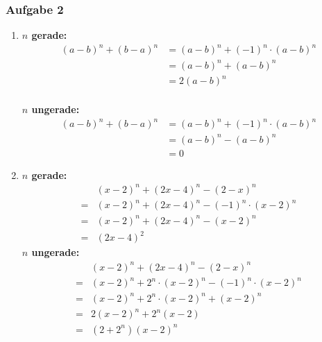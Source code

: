 \subsubsection{Aufgabe 2}
\begin{enumerate}
	\item \textbf{$ n $ gerade:} \begin{align*} (a-b)^n + (b-a)^n &= (a-b)^n + (-1)^n\cdot(a-b)^n \\
																																&= (a-b)^n + (a-b)^n \\
																																&= 2(a-b)^n \end{align*} \\
				\textbf{$ n $ ungerade:} \begin{align*}  (a-b)^n + (b-a)^n	&= (a-b)^n + (-1)^n\cdot(a-b)^n \\
																																		&= (a-b)^n -(a-b)^n \\
																																		&= 0 \end{align*}							%
	\item \textbf{$ n $ gerade:}\begin{align*}  &(x-2)^n + (2x-4)^n - (2-x)^n	\\
																						= &(x-2)^n + (2x-4)^n - (-1)^n\cdot(x-2)^n \\
																						= &(x-2)^n + (2x-4)^n - (x-2)^n \\
																						= &(2x-4)^2 \end{align*}	
				\textbf{$ n $ ungerade:} \begin{align*}	&(x-2)^n + (2x-4)^n - (2-x)^n	\\
																							= &(x-2)^n + 2^n\cdot(x-2)^n - (-1)^n\cdot(x-2)^n \\
																							= &(x-2)^n + 2^n\cdot(x-2)^n + (x-2)^n \\
																							= &2(x-2)^n + 2^n(x-2) \\
																							= &(2+2^n)(x-2)^n \end{align*}%
\end{enumerate}


